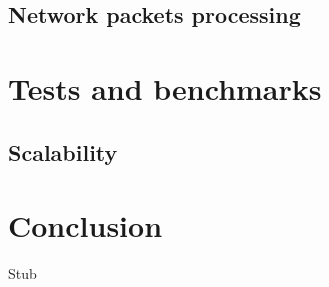 \documentclass[10pt, conference, compsocconf]{IEEEtran}
\begin{document}
\subsection{Network packets processing}

\section{Tests and benchmarks}

\subsection{Scalability}

\section{Conclusion}


\begin{thebibliography}{99}
Stub
\end{thebibliography}
\end{document}
